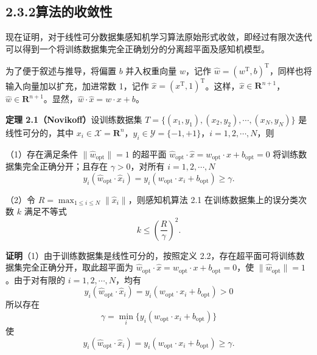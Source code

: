 \documentclass[UTF8,12pt,a4paper,fontset=fandol]{ctexart}
\begin{document}
\subsection*{2.3.2\quad 算法的收敛性}

现在证明，对于线性可分数据集感知机学习算法原始形式收敛，即经过有限次迭代可以得到一个将训练数据集完全正确划分的分离超平面及感知机模型。

为了便于叙述与推导，将偏置 $b$ 并入权重向量 $w$，记作 $\hat{w}=(w^\mathrm{T},b)^\mathrm{T}$，同样也将输入向量加以扩充，加进常数 1，记作 $\hat{x}=(x^\mathrm{T},1)^\mathrm{T}$。这样，$\hat{x}\in\mathbf{R}^{n+1}$，$\hat{w}\in\mathbf{R}^{n+1}$。显然，$\hat{w}\cdot\hat{x}=w\cdot x+b$。

\noindent\textbf{定理 2.1（Novikoff）}\quad 设训练数据集 $T=\{(x_1,y_1),(x_2,y_2),\cdots,(x_N,y_N)\}$ 是线性可分的，其中 $x_i\in\mathcal{X}=\mathbf{R}^n$，$y_i\in\mathcal{Y}=\{-1,+1\}$，$i=1,2,\cdots,N$，则

（1）存在满足条件 $\|\hat{w}_{\mathrm{opt}}\|=1$ 的超平面 $\hat{w}_{\mathrm{opt}}\cdot\hat{x}=w_{\mathrm{opt}}\cdot x+b_{\mathrm{opt}}=0$ 将训练数据集完全正确分开；且存在 $\gamma>0$，对所有 $i=1,2,\cdots,N$
\begin{equation}
  y_i(\hat{w}_{\mathrm{opt}}\cdot\hat{x}_i)
  =y_i(w_{\mathrm{opt}}\cdot x_i+b_{\mathrm{opt}})\ge\gamma.
  \tag{2.8}
\end{equation}

（2）令 $R=\max_{1\le i\le N}\|\hat{x}_i\|$，则感知机算法 2.1 在训练数据集上的误分类次数 $k$ 满足不等式
\begin{equation}
  k\le\left(\frac{R}{\gamma}\right)^2.
  \tag{2.9}
\end{equation}

\noindent\textbf{证明}\quad （1）由于训练数据集是线性可分的，按照定义 2.2，存在超平面可将训练数据集完全正确分开，取此超平面为 $\hat{w}_{\mathrm{opt}}\cdot\hat{x}=w_{\mathrm{opt}}\cdot x+b_{\mathrm{opt}}=0$，使 $\|\hat{w}_{\mathrm{opt}}\|=1$。由于对有限的 $i=1,2,\cdots,N$，均有
\[
  y_i(\hat{w}_{\mathrm{opt}}\cdot\hat{x}_i)
  =y_i(w_{\mathrm{opt}}\cdot x_i+b_{\mathrm{opt}})>0
\]
所以存在
\[
  \gamma=\min_i\{y_i(w_{\mathrm{opt}}\cdot x_i+b_{\mathrm{opt}})\}
\]
使
\[
  y_i(\hat{w}_{\mathrm{opt}}\cdot\hat{x}_i)
  =y_i(w_{\mathrm{opt}}\cdot x_i+b_{\mathrm{opt}})\ge\gamma.
\]
\end{document}
